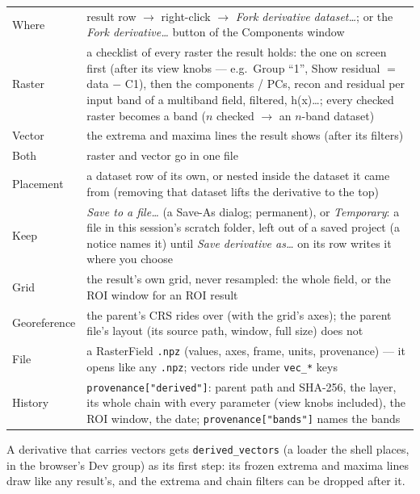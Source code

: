 \documentclass[10pt]{article}
\newcommand{\dev}[1]{\texttt{#1}}
\begin{document}
\begin{longtable}{L M}
\toprule
Where & result row $\to$ right-click $\to$ \emph{Fork derivative dataset\ldots}; or the
        \emph{Fork derivative\ldots} button of the Components window \\
Raster & a checklist of every raster the result holds: the one on screen first (after its
         view knobs --- e.g.\ Group ``1'', Show residual $=$ data $-$ C1), then the
         components / PCs, recon and residual per input band of a multiband field, filtered,
         h(x)\ldots; every checked raster becomes a band ($n$ checked $\to$ an $n$-band
         dataset) \\
Vector & the extrema and maxima lines the result shows (after its filters) \\
Both & raster and vector go in one file \\
Placement & a dataset row of its own, or nested inside the dataset it came from (removing that
            dataset lifts the derivative to the top) \\
Keep & \emph{Save to a file\ldots} (a Save-As dialog; permanent), or \emph{Temporary}: a
       file in this session's scratch folder, left out of a saved project (a notice names it)
       until \emph{Save derivative as\ldots} on its row writes it where you choose \\
Grid & the result's own grid, never resampled: the whole field, or the ROI window for an ROI
       result \\
Georeference & the parent's CRS rides over (with the grid's axes); the parent file's layout
               (its source path, window, full size) does not \\
File & a RasterField \texttt{.npz} (values, axes, frame, units, provenance) --- it opens like
       any \texttt{.npz}; vectors ride under \texttt{vec\_*} keys \\
History & \texttt{provenance["derived"]}: parent path and SHA-256, the layer, its whole chain
          with every parameter (view knobs included), the ROI window, the date;
          \texttt{provenance["bands"]} names the bands \\
\bottomrule
\end{longtable}

A derivative that carries vectors gets \dev{derived\_vectors} (a loader the shell places, in the
browser's Dev group) as its first step: its frozen extrema and maxima lines draw like any
result's, and the extrema and chain filters can be dropped after it.
\end{document}
